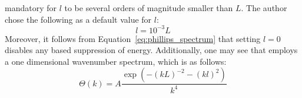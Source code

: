 mandatory for $l$ to be several orders of magnitude smaller than $L$. The author
chose the following as a default value for $l$:
\begin{equation*}
 l = 10^{-3}L
\end{equation*}
Moreover, it follows from Equation~\ref{eq:phillips_spectrum} that setting 
${l = 0}$ disables any \wavenumber based suppression of energy. Additionally,
one may see that \citeauthor{course:simulatingocean} employs a one dimensional
wavenumber spectrum, which is as follows:
\begin{equation}
\label{eq:phillips_wavenumber_spectrum}
  \Theta(k) = A\frac{\exp\left(-(kL)^{-2}-(kl)^2\right)}{k^4}
\end{equation}
%
